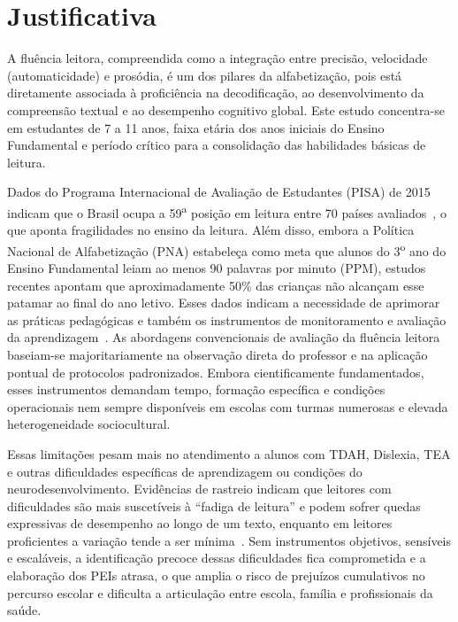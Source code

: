 \documentclass[12pt]{article}
\begin{document}
\section{Justificativa}
\label{sec:justificativa}
A fluência leitora, compreendida como a integração entre precisão, velocidade (automaticidade) e prosódia, é um dos pilares da alfabetização, pois está diretamente associada à proficiência na decodificação, ao desenvolvimento da compreensão textual e ao desempenho cognitivo global. Este estudo concentra-se em estudantes de 7 a 11 anos, faixa etária dos anos iniciais do Ensino Fundamental e período crítico para a consolidação das habilidades básicas de leitura.

Dados do Programa Internacional de Avaliação de Estudantes (PISA) de 2015 indicam que o Brasil ocupa a 59\textsuperscript{a} posição em leitura entre 70 países avaliados~\cite{oecd2016pisa}, o que aponta fragilidades no ensino da leitura. Além disso, embora a Política Nacional de Alfabetização (PNA) estabeleça como meta que alunos do 3\textsuperscript{o} ano do Ensino Fundamental leiam ao menos 90 palavras por minuto (PPM), estudos recentes apontam que aproximadamente 50\% das crianças não alcançam esse patamar ao final do ano letivo. Esses dados indicam a necessidade de aprimorar as práticas pedagógicas e também os instrumentos de monitoramento e avaliação da aprendizagem~\cite{MARTINSREIS2023}. As abordagens convencionais de avaliação da fluência leitora baseiam-se majoritariamente na observação direta do professor e na aplicação pontual de protocolos padronizados. Embora cientificamente fundamentados, esses instrumentos demandam tempo, formação específica e condições operacionais nem sempre disponíveis em escolas com turmas numerosas e elevada heterogeneidade sociocultural.

Essas limitações pesam mais no atendimento a alunos com TDAH, Dislexia, TEA e outras dificuldades específicas de aprendizagem ou condições do neurodesenvolvimento. Evidências de rastreio indicam que leitores com dificuldades são mais suscetíveis à ``fadiga de leitura'' e podem sofrer quedas expressivas de desempenho ao longo de um texto, enquanto em leitores proficientes a variação tende a ser mínima~\cite{BERNSTEIN2017}. Sem instrumentos objetivos, sensíveis e escaláveis, a identificação precoce dessas dificuldades fica comprometida e a elaboração dos PEIs atrasa, o que amplia o risco de prejuízos cumulativos no percurso escolar e dificulta a articulação entre escola, família e profissionais da saúde.
\end{document}
